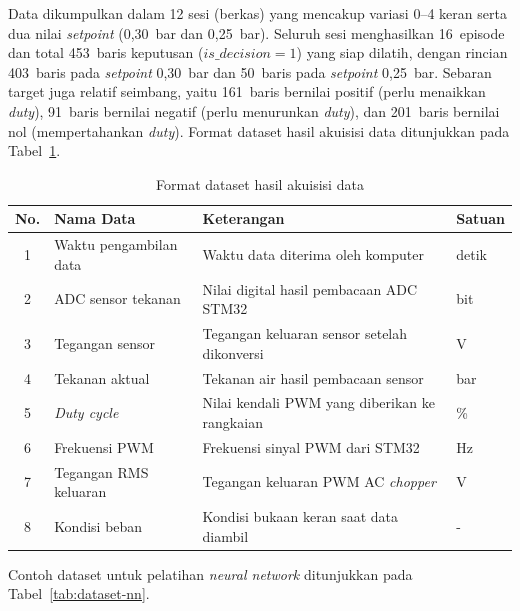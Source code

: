 Data dikumpulkan dalam 12 sesi (berkas) yang mencakup variasi 0--4 keran serta
dua nilai \emph{setpoint} (0,30~bar dan 0,25~bar). Seluruh sesi menghasilkan
16~episode dan total 453~baris keputusan ($is\_decision=1$) yang siap dilatih,
dengan rincian 403~baris pada \emph{setpoint} 0,30~bar dan 50~baris pada
\emph{setpoint} 0,25~bar. Sebaran target juga relatif seimbang, yaitu 161~baris
bernilai positif (perlu menaikkan \emph{duty}), 91~baris bernilai negatif
(perlu menurunkan \emph{duty}), dan 201~baris bernilai nol (mempertahankan
\emph{duty}).
Format dataset hasil akuisisi data ditunjukkan pada Tabel~\ref{tab:format-dataset-akuisisi}.

\begin{table}[H]
\centering
\caption{Format dataset hasil akuisisi data}
\label{tab:format-dataset-akuisisi}
\begin{tabularx}{\linewidth}{|c|>{\raggedright\arraybackslash\hsize=0.9\hsize}X|>{\raggedright\arraybackslash\hsize=1.3\hsize}X|>{\centering\arraybackslash\hsize=0.8\hsize}X|}
\hline
\textbf{No.} &
\textbf{Nama Data} &
\textbf{Keterangan} &
\textbf{Satuan} \\
\hline
1 & Waktu pengambilan data & Waktu data diterima oleh komputer & detik \\
\hline
2 & ADC sensor tekanan & Nilai digital hasil pembacaan ADC STM32 & bit \\
\hline
3 & Tegangan sensor & Tegangan keluaran sensor setelah dikonversi & V \\
\hline
4 & Tekanan aktual & Tekanan air hasil pembacaan sensor & bar \\
\hline
5 & \emph{Duty cycle} & Nilai kendali PWM yang diberikan ke rangkaian & \% \\
\hline
6 & Frekuensi PWM & Frekuensi sinyal PWM dari STM32 & Hz \\
\hline
7 & Tegangan RMS keluaran & Tegangan keluaran PWM AC \emph{chopper} & V \\
\hline
8 & Kondisi beban & Kondisi bukaan keran saat data diambil & - \\
\hline
\end{tabularx}
\end{table}
Contoh dataset untuk pelatihan \emph{neural network} ditunjukkan pada Tabel~\ref{tab:dataset-nn}.

